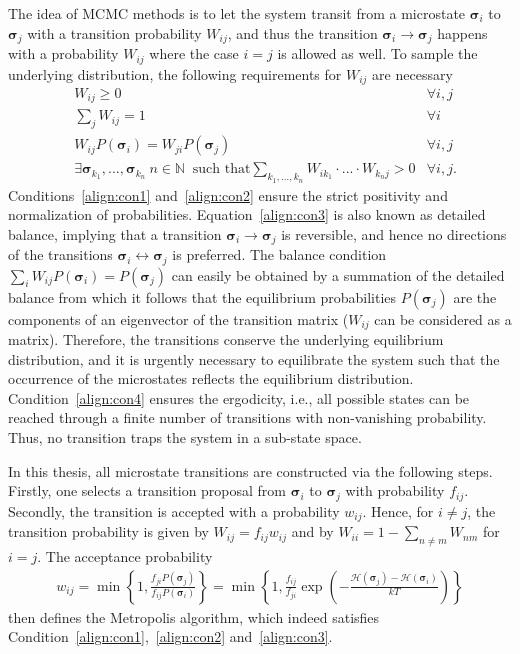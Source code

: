 The idea of MCMC methods is to let the system transit from a microstate $\bm{\sigma}_i$ to $\bm{\sigma}_j$ with a transition probability $W_{ij}$, and 
thus the transition $\bm{\sigma}_i\to\bm{\sigma}_j$ happens with a probability $W_{ij}$ where the case $i\!=\!j$ is allowed as well. To sample the 
underlying distribution, the following requirements for $W_{ij}$ are necessary
\begin{align}
    &W_{ij} \ge 0                        &\forall i,j  
        \label{align:con1}\\
    &\sum_jW_{ij} = 1                    &\forall i
        \label{align:con2}\\
    &W_{ij}P(\bm{\sigma}_i)=W_{ji}P(\bm{\sigma}_j) &\forall i,j
        \label{align:con3}\\
    &\exists\bm{\sigma}_{k_1},...,\bm{\sigma}_{k_n} \  n\!\in\!\mathbb{N} \  \text{  such that} 
                             \sum_{k_1,...,k_n}\!\!\!\!W_{ik_1}\!\!\cdot...\cdot\!W_{k_nj}>0 &\forall i,j.
        \label{align:con4}
\end{align}
Conditions~\eqref{align:con1} and~\eqref{align:con2} ensure the strict positivity and normalization of probabilities. Equation~\eqref{align:con3} is also known as 
detailed balance, implying that a transition $\bm{\sigma}_i\to\bm{\sigma}_j$ is reversible, and hence no directions of the transitions $\bm{\sigma}_i\leftrightarrow\bm{\sigma}_j$ 
is preferred. The balance condition $\sum_iW_{ij}P(\bm{\sigma}_i)=P(\bm{\sigma}_j)$ can easily be obtained by a summation of the detailed balance from which
it follows that the equilibrium probabilities $P(\bm{\sigma}_j)$ are the components of an eigenvector of the transition matrix ($W_{ij}$ can be 
considered as a matrix).
Therefore, the transitions conserve the underlying equilibrium distribution, and it is urgently necessary to equilibrate the system such that the occurrence
of the microstates reflects the equilibrium distribution. Condition~\eqref{align:con4} ensures the ergodicity, i.e., all possible states
can be reached through a finite number of transitions with non-vanishing probability. Thus, no transition traps the system in a sub-state space.~\cite{Janke2012}

In this thesis, all microstate transitions are constructed via the following steps. Firstly, one selects a transition
proposal from $\bm{\sigma}_i$ to $\bm{\sigma}_j$ with probability $f_{ij}$. Secondly, the transition is accepted with a probability $w_{ij}$. Hence, for $i\!\neq\!j$,
the transition probability is  given by $W_{ij}\!=\!f_{ij}w_{ij}$ and by $W_{ii}\!=\!1\!-\!\sum_{n\neq m}\!W_{nm}$ for $i=j$. The acceptance probability
\begin{align*}
    w_{ij}=\min\left\{1,\frac{f_{ji}P(\bm{\sigma}_j)}{f_{ij}P(\bm{\sigma}_i)}\right\}
          =\min\left\{1,\frac{f_{ij}}{f_{ji}}\exp\left(-\frac{\mathcal{H}(\bm{\sigma}_j)-\mathcal{H}(\bm{\sigma}_i)}{kT}\right)\right\}
\end{align*}
then defines the Metropolis algorithm, which indeed
satisfies Condition~\eqref{align:con1},~\eqref{align:con2} and~\eqref{align:con3}.~\cite{Janke2012} 

